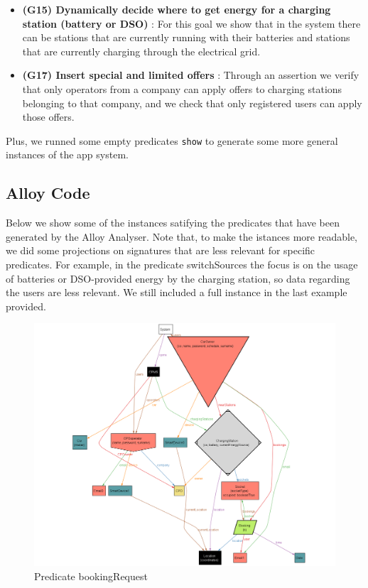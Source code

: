 \documentclass[table, 12pt]{article} %
\begin{document}
\begin{itemize}
        \item \textbf{(G15) Dynamically decide where to get energy for a charging station (battery or DSO) }: For this goal we show that in the system there can be stations that are currently running with their batteries and stations that are currently charging through the electrical grid.
        \item \textbf{(G17) Insert special and limited offers }: Through an assertion we verify that only operators from a company can apply offers to charging stations belonging to that company, and we check that only registered users can apply those offers.
 
        
    \end{itemize}

    Plus, we runned some empty predicates \texttt{show} to generate some more general instances of the app system.

    \newpage
    \subsection{Alloy Code}
    

    Below we show some of the instances satifying the predicates that have been generated by the Alloy Analyser.
    Note that, to make the istances more readable, we did some projections on signatures that are less relevant for specific predicates. 
    For example, in the predicate switchSources the focus is on the usage of batteries or DSO-provided energy by the charging station, so data regarding the users are less relevant.
    We still included a full instance in the last example provided.

    \begin{center}
        \begin{figure}[H]
            \includegraphics[scale=0.38, center]{assets/alloy/pred_bookingRequest.png}
            \caption{Predicate bookingRequest}
            \label{fig: bookingRequest_alloy}
        \end{figure}
    \end{center}
\end{document}

